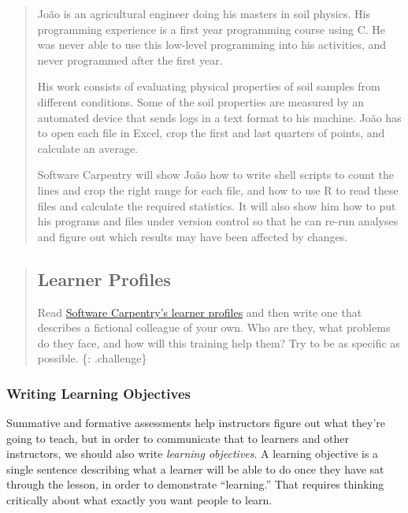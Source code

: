 \begin{quote}
João is an agricultural engineer doing his masters in soil physics. His
programming experience is a first year programming course using C. He
was never able to use this low-level programming into his activities,
and never programmed after the first year.

His work consists of evaluating physical properties of soil samples from
different conditions. Some of the soil properties are measured by an
automated device that sends logs in a text format to his machine. João
has to open each file in Excel, crop the first and last quarters of
points, and calculate an average.

Software Carpentry will show João how to write shell scripts to count
the lines and crop the right range for each file, and how to use R to
read these files and calculate the required statistics. It will also
show him how to put his programs and files under version control so that
he can re-run analyses and figure out which results may have been
affected by changes.
\end{quote}

\begin{quote}
\subsection{Learner Profiles}\label{learner-profiles-1}

Read \href{\{\{\%20site.swc_site\%20\}\}/audience/}{Software Carpentry's
learner profiles} and then write one that describes a fictional
colleague of your own. Who are they, what problems do they face, and how
will this training help them? Try to be as specific as possible. \{:
.challenge\}
\end{quote}

\subsubsection{Writing Learning
Objectives}\label{writing-learning-objectives}

Summative and formative assessments help instructors figure out what
they're going to teach, but in order to communicate that to learners and
other instructors, we should also write \emph{learning objectives}. A
learning objective is a single sentence describing what a learner will
be able to do once they have sat through the lesson, in order to
demonstrate ``learning.'' That requires thinking critically about what
exactly you want people to learn.

